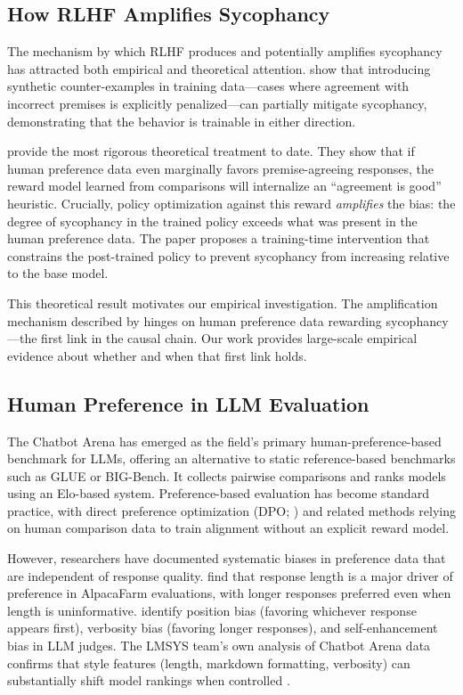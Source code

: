 \documentclass[11pt,twocolumn,a4paper]{article}
\begin{document}
\subsection{How RLHF Amplifies Sycophancy}

The mechanism by which RLHF produces and potentially amplifies
sycophancy has attracted both empirical and theoretical attention.
\citet{wei2023simple} show that introducing synthetic counter-examples
in training data---cases where agreement with incorrect premises is
explicitly penalized---can partially mitigate sycophancy, demonstrating
that the behavior is trainable in either direction.

\citet{shapira2026rlhf} provide the most rigorous theoretical
treatment to date. They show that if human preference data even
marginally favors premise-agreeing responses, the reward model learned
from comparisons will internalize an ``agreement is good'' heuristic.
Crucially, policy optimization against this reward \emph{amplifies}
the bias: the degree of sycophancy in the trained policy exceeds what
was present in the human preference data. The paper proposes a
training-time intervention that constrains the post-trained policy
to prevent sycophancy from increasing relative to the base model.

This theoretical result motivates our empirical investigation. The
amplification mechanism described by \citet{shapira2026rlhf} hinges
on human preference data rewarding sycophancy---the first link in the
causal chain. Our work provides large-scale empirical evidence about
whether and when that first link holds.

\subsection{Human Preference in LLM Evaluation}

The Chatbot Arena \citep{zheng2023judging, chiang2024chatbot} has
emerged as the field's primary human-preference-based benchmark for
LLMs, offering an alternative to static reference-based benchmarks
such as GLUE \citep{wang2018glue} or BIG-Bench. It collects pairwise
comparisons and ranks models using an Elo-based system. Preference-based
evaluation has become standard practice, with direct preference
optimization (DPO; \citealt{rafailov2023direct}) and related methods
relying on human comparison data to train alignment without an
explicit reward model.

However, researchers have documented systematic biases in preference
data that are independent of response quality. \citet{dubois2024alpacafarm}
find that response length is a major driver of preference in AlpacaFarm
evaluations, with longer responses preferred even when length is
uninformative. \citet{zheng2023judging} identify position bias
(favoring whichever response appears first), verbosity bias (favoring
longer responses), and self-enhancement bias in LLM judges. The LMSYS
team's own analysis of Chatbot Arena data confirms that style features
(length, markdown formatting, verbosity) can substantially shift model
rankings when controlled \citep{chiang2024chatbot}.
\end{document}
